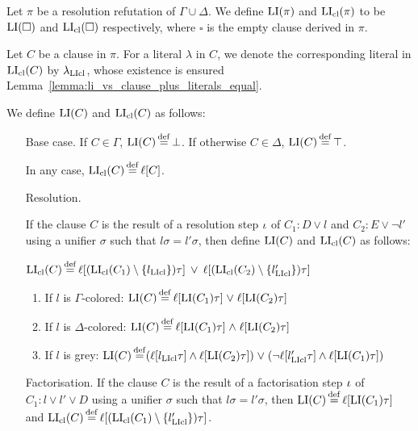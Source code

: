 \documentclass[,%
	draft=false,%
	numbers=noendperiod
	11pt,
	a4paper,
	oneside,%
	openany,
]{memoir}
\begin{document}
\begin{defi}
	Let $\pi$ be a resolution refutation of $\Gamma \cup \Delta$.
	We define $\operatorname{LI}(\pi)$ and $\operatorname{LI}_{\operatorname{cl}}(\pi)$ to be $\operatorname{LI}(\square)$ and $\operatorname{LI}_{\operatorname{cl}}(\square)$ respectively, where $\square$ is the empty clause derived in $\pi$.

	Let $C$ be a clause in $\pi$. 
	For a literal $\lambda$ in $C$, we denote the corresponding literal in $\operatorname{LI}_{\operatorname{cl}}(C)$ by $\lambda_{\operatorname{LIcl}}$, whose existence is ensured Lemma~\ref{lemma:li_vs_clause_plus_literals_equal}.

	We define $\operatorname{LI}(C)$ and $\operatorname{LI}_{\operatorname{cl}}(C)$ as follows:

	\begin{itemize}
		\item[Base case.]
			If $C \in \Gamma$, $\operatorname{LI}(C) \operatorname{\stackrel{\mathrm{def}}{=}} \bot$.
			If otherwise $C \in \Delta$, $\operatorname{LI}(C) \operatorname{\stackrel{\mathrm{def}}{=}} \top$.

			In any case, $\operatorname{LI}_{\operatorname{cl}}(C) \operatorname{\stackrel{\mathrm{def}}{=}} \ell[C]$.
		\item[Resolution.]

			If the clause $C$ is the result of a resolution step $\iota$ of $C_1: D \lor l$ and $C_2: E \lor \lnot l'$ using a unifier $\sigma$ such that $l\sigma =  l'\sigma$, then define $\operatorname{LI}(C)$ and $\operatorname{LI}_{\operatorname{cl}}(C)$ as follows:

			$\operatorname{LI}_{\operatorname{cl}}(C) \operatorname{\stackrel{\mathrm{def}}{=}} \ell[(\operatorname{LI}_{\operatorname{cl}}(C_1) \setminus \{l_{\operatorname{LIcl}}\})\tau] \;\,{\lor}\;\, \ell[(\operatorname{LI}_{\operatorname{cl}}(C_2)\setminus \{l_{\operatorname{LIcl}}'\})\tau] $

			\begin{enumerate}

				\item If $l$ is $\Gamma$-colored:
					$\operatorname{LI}(C) \operatorname{\stackrel{\mathrm{def}}{=}} \ell[\operatorname{LI}(C_1)\tau]\;{\lor}\; \ell[\operatorname{LI}(C_2)\tau] $

				\item If $l$ is $\Delta$-colored:
					$\operatorname{LI}(C) \operatorname{\stackrel{\mathrm{def}}{=}} \ell[\operatorname{LI}(C_1)\tau]\;{\land}\; \ell[\operatorname{LI}(C_2)\tau] $

				\item If $l$ is grey:
					$\operatorname{LI}(C) \operatorname{\stackrel{\mathrm{def}}{=}}
					(\ell[l_{\operatorname{LIcl}}\tau] \land \ell[\operatorname{LI}(C_2)\tau]) \;{\lor}\;
					(\lnot \ell[l'_{\operatorname{LIcl}}\tau]\land \ell[\operatorname{LI}(C_1)\tau ])
					$

			\end{enumerate}

		\item[Factorisation.]
			If the clause $C$ is the result of a factorisation step $\iota$ of $C_1: l \lor l' \lor D$ using a unifier $\sigma$ such that $l\sigma = l'\sigma$, then $\operatorname{LI}(C) \operatorname{\stackrel{\mathrm{def}}{=}} \ell[\operatorname{LI}(C_1)\tau]$ and $\lifiboth{C} \defeq \lifboth{ (\lifiboth{C_1} \setminus\nolinebreak \{l'\cll\})\tau}$.


\end{itemize}
\end{defi}
\end{document}
